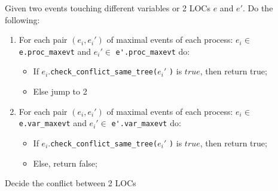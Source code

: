 \documentclass{llncs}
\begin{document}
\begin{algorithm}
Given two events touching different variables or 2 LOCs $e$ and $e'$.
Do the following:
\begin{enumerate}
	\item
		For each pair $(e_i, e_i')$ of maximal events of each process:
		$e_i \in$ \verb!e.proc_maxevt! and $e_i' \in$ \verb!e'.proc_maxevt! do: \\
		\begin{itemize}
			\item
				If $e_i$.\verb!check_conflict_same_tree(!$e_i'$ \verb!)! is $true$, then  return true;
			\item
				Else jump to 2
		\end{itemize}
			
	\item
		For each pair $(e_i, e_i')$ of maximal events of each process:
		$e_i \in $ \verb!e.var_maxevt! and $e_i' \in$ \verb!e'.var_maxevt! do:\\
			\begin{itemize}
			\item
				If $e_i$.\verb!check_conflict_same_tree(!$e_i'$ \verb!)! is $true$, then  return true;
			\item
				Else, return false;
		\end{itemize}
			
\end{enumerate}
\caption{Decide the conflict between 2 LOCs}
\label{a:arb}	
\end{algorithm}
\end{document}
